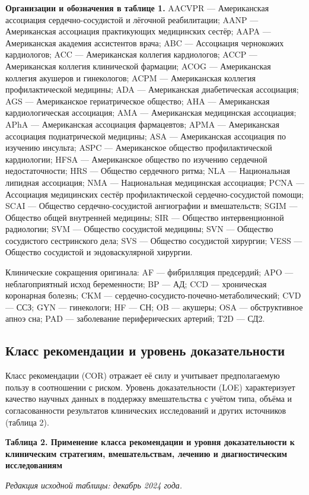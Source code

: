 \documentclass[11pt,a4paper]{article}
\newcommand{\heading}[1]{\par\medskip\textbf{#1}\par}
\begin{document}
{\footnotesize
\textbf{Организации и обозначения в таблице 1.}
AACVPR --- Американская ассоциация сердечно-сосудистой и лёгочной реабилитации;
AANP --- Американская ассоциация практикующих медицинских сестёр;
AAPA --- Американская академия ассистентов врача;
ABC --- Ассоциация чернокожих кардиологов;
ACC --- Американская коллегия кардиологов;
ACCP --- Американская коллегия клинической фармации;
ACOG --- Американская коллегия акушеров и гинекологов;
ACPM --- Американская коллегия профилактической медицины;
ADA --- Американская диабетическая ассоциация;
AGS --- Американское гериатрическое общество;
AHA --- Американская кардиологическая ассоциация;
AMA --- Американская медицинская ассоциация;
APhA --- Американская ассоциация фармацевтов;
APMA --- Американская ассоциация подиатрической медицины;
ASA --- Американская ассоциация по изучению инсульта;
ASPC --- Американское общество профилактической кардиологии;
HFSA --- Американское общество по изучению сердечной недостаточности;
HRS --- Общество сердечного ритма;
NLA --- Национальная липидная ассоциация;
NMA --- Национальная медицинская ассоциация;
PCNA --- Ассоциация медицинских сестёр профилактической сердечно-сосудистой помощи;
SCAI --- Общество сердечно-сосудистой ангиографии и вмешательств;
SGIM --- Общество общей внутренней медицины;
SIR --- Общество интервенционной радиологии;
SVM --- Общество сосудистой медицины;
SVN --- Общество сосудистого сестринского дела;
SVS --- Общество сосудистой хирургии;
VESS --- Общество сосудистой и эндоваскулярной хирургии.

Клинические сокращения оригинала: AF --- фибрилляция предсердий; APO --- неблагоприятный исход беременности; BP --- АД; CCD --- хроническая коронарная болезнь; CKM --- сердечно-сосудисто-почечно-метаболический; CVD --- ССЗ; GYN --- гинекологи; HF --- СН; OB --- акушеры; OSA --- обструктивное апноэ сна; PAD --- заболевание периферических артерий; T2D --- СД2.
}

\subsection{Класс рекомендации и уровень доказательности}
Класс рекомендации (COR) отражает её силу и учитывает предполагаемую пользу в соотношении с риском. Уровень доказательности (LOE) характеризует качество научных данных в поддержку вмешательства с учётом типа, объёма и согласованности результатов клинических исследований и других источников (таблица 2).

\heading{Таблица 2. Применение класса рекомендации и уровня доказательности к клиническим стратегиям, вмешательствам, лечению и диагностическим исследованиям}
\textit{Редакция исходной таблицы: декабрь 2024 года.}
\end{document}
